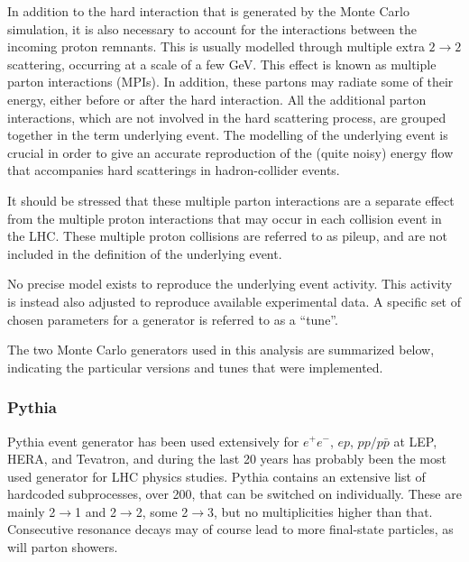 In addition to the hard interaction that is generated by the Monte Carlo
simulation, it is also necessary to account for the interactions between the incoming proton  remnants. This is usually modelled through multiple extra $2\rightarrow 2$ scattering, occurring at a scale of a few GeV. This effect is known as multiple parton interactions (MPIs). In addition, these partons may radiate some of their energy, either before or after the hard interaction.  All the additional parton interactions, which are not involved in the hard scattering process, are grouped together in the term underlying event. The modelling of the underlying event is crucial in order to give an accurate reproduction of the (quite noisy) energy flow that accompanies hard scatterings in hadron-collider events.

It should be stressed that these multiple parton interactions are a separate effect from the multiple proton interactions that may occur in each collision event in the LHC. These multiple proton collisions are referred to as pileup, and are not included in the definition of the underlying event. 

No precise model exists to reproduce the underlying event activity. This activity is instead also adjusted to reproduce available experimental data. A specific set of chosen parameters for a generator is referred to as a ``tune''.  

The two Monte Carlo generators used in this analysis are summarized below, indicating the particular versions and tunes that were implemented.


\subsubsection{Pythia}

{\sc Pythia} event generator has been used extensively for $e^+ e^-$, $ep$, $pp/p\bar{p}$ at LEP, HERA, and Tevatron, and during the last 20 years has probably been the most used generator for LHC physics studies.  {\sc Pythia} contains an extensive list of hardcoded subprocesses, over 200, that can be switched on individually. These are mainly 2$\rightarrow$1 and  2$\rightarrow$2, some  2$\rightarrow$3, but no multiplicities higher than that. Consecutive resonance decays may of course lead to more final-state particles, as will parton showers.

